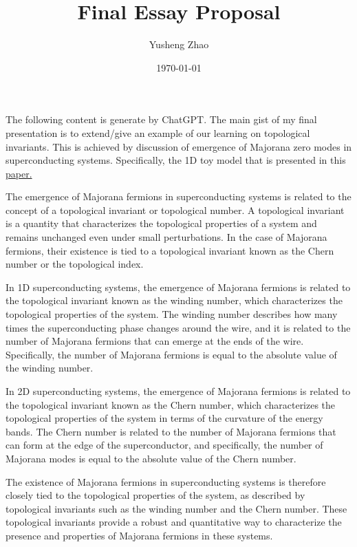 \documentclass[11pt]{article}
\author{Yusheng Zhao}
\date{\today}
\title{Final Essay Proposal}
\begin{document}
\maketitle
\tableofcontents

The following content is generate by ChatGPT. The main gist of my final
presentation is to extend/give an example of our learning on topological
invariants. This is achieved by discussion of emergence of Majorana zero modes
in superconducting systems. Specifically, the 1D toy model that is presented in
this \href{https://arxiv.org/pdf/1202.1293.pdf}{paper.}

The emergence of Majorana fermions in superconducting systems is related to the
concept of a topological invariant or topological number. A topological
invariant is a quantity that characterizes the topological properties of a
system and remains unchanged even under small perturbations. In the case of
Majorana fermions, their existence is tied to a topological invariant known as
the Chern number or the topological index.

In 1D superconducting systems, the emergence of Majorana fermions is related to
the topological invariant known as the winding number, which characterizes the
topological properties of the system. The winding number describes how many
times the superconducting phase changes around the wire, and it is related to
the number of Majorana fermions that can emerge at the ends of the wire.
Specifically, the number of Majorana fermions is equal to the absolute value of
the winding number.

In 2D superconducting systems, the emergence of Majorana fermions is related to
the topological invariant known as the Chern number, which characterizes the
topological properties of the system in terms of the curvature of the energy
bands. The Chern number is related to the number of Majorana fermions that can
form at the edge of the superconductor, and specifically, the number of Majorana
modes is equal to the absolute value of the Chern number.

The existence of Majorana fermions in superconducting systems is therefore
closely tied to the topological properties of the system, as described by
topological invariants such as the winding number and the Chern number. These
topological invariants provide a robust and quantitative way to characterize the
presence and properties of Majorana fermions in these systems.
\end{document}
